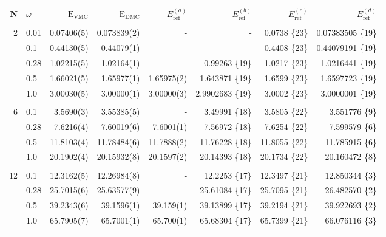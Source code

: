 \begin{table}
\begin{center}
\begin{tabular}{rl|rrrrrr}
    N     & $\omega$ & $\mathrm{E_{VMC}}$ & $\mathrm{E_{DMC}}$ & $E_\mathrm{ref}^{(a)}$& $E_\mathrm{ref}^{(b)}$ & $E_\mathrm{ref}^{(c)}$ & $E_\mathrm{ref}^{(d)}$\\
\hline\hline
\multicolumn{8}{c}{} \\
    2     &   0.01   & 0.07406(5)  & 0.073839(2)  & -		& -			& 0.0738 \{23\} & 0.07383505 \{19\}\\
          &   0.1    & 0.44130(5)  & 0.44079(1)   & - 		& - 			& 0.4408 \{23\} & 0.44079191 \{19\}\\
          &   0.28   & 1.02215(5)  & 1.02164(1)   & -		&0.99263 \{19\} 	& 1.0217 \{23\}  & 1.0216441 \{19\}\\
          &   0.5    & 1.66021(5)  & 1.65977(1)   & 1.65975(2)&1.643871 \{19\}	& 1.6599 \{23\}  & 1.6597723 \{19\}\\
          &   1.0    & 3.00030(5)  & 3.00000(1)   & 3.00000(3)&2.9902683 \{19\}	& 3.0002 \{23\}  & 3.0000001 \{19\}\\
\cline{2-8}
\multicolumn{8}{c}{} \\
    6     &   0.1    &  3.5690(3)  &  3.55385(5)  & -		&3.49991 \{18\} 	& 3.5805 \{22\}  & 3.551776 \{9\}\\
          &   0.28   &  7.6216(4)  &  7.60019(6)  & 7.6001(1) &7.56972 \{18\} 	& 7.6254 \{22\}  & 7.599579 \{6\}\\
          &   0.5    & 11.8103(4)  & 11.78484(6)  & 11.7888(2)&11.76228 \{18\}	& 11.8055 \{22\} & 11.785915 \{6\}\\
          &   1.0    & 20.1902(4)  & 20.15932(8)  & 20.1597(2)&20.14393 \{18\}	& 20.1734 \{22\} & 20.160472 \{8\}\\
\cline{2-8}
\multicolumn{8}{c}{} \\
    12    &   0.1    & 12.3162(5)  & 12.26984(8)  & - 		&12.2253 \{17\} 	& 12.3497 \{21\} & 12.850344 \{3\}\\
          &   0.28   & 25.7015(6)  & 25.63577(9)  & - 		&25.61084 \{17\} 	& 25.7095 \{21\} & 26.482570 \{2\}\\
          &   0.5    & 39.2343(6)  & 39.1596(1)   & 39.159(1) &39.13899 \{17\}	& 39.2194 \{21\} & 39.922693 \{2\}\\
          &   1.0    & 65.7905(7)  & 65.7001(1)   & 65.700(1) &65.68304 \{17\}	& 65.7399 \{21\} & 66.076116 \{3\}\\
\cline{2-8}
\multicolumn{8}{c}{} \\

\end{tabular}
\end{center}
\end{table}
